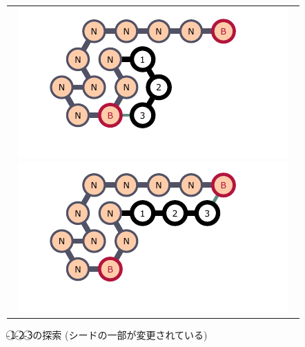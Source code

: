 \documentclass[a4,11pt]{article}
\begin{document}
\begin{figure}[h]
\centering
\begin{tabular}{c}

\begin{minipage}{0.33\hsize}
\centering
	\includegraphics[width=\textwidth]{fig/svg/confex3_0.pdf}
\end{minipage}

\begin{minipage}{0.33\hsize}
\centering
	\includegraphics[width=\textwidth]{fig/svg/confex3_1.pdf}
\end{minipage}

\end{tabular}
\caption{{-}\textcircled{\scriptsize 1}{-}\textcircled{\scriptsize 2}{-}\textcircled{\scriptsize 3}の探索 (シードの一部が変更されている)}
\label{fig:glider3_01}
\end{figure}
\end{document}
